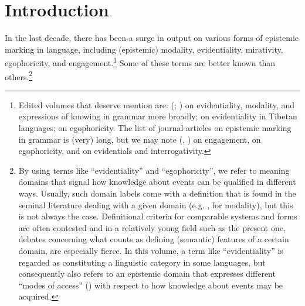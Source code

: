 \documentclass[output=paper]{langsci/langscibook}
\author{Henrik Bergqvist and Seppo Kittilä}
\begin{document}
\maketitle

\section{Introduction}\label{s:hb1}
In the last decade, there has been a surge in output on various forms of epistemic marking in language, including (epistemic) modality, evidentiality, mirativity, egophoricity, and engagement.\footnote{Edited volumes that deserve mention are: \citeauthor{AikhenvaldDixon2003} (\citeyear{AikhenvaldDixon2003}; \citeyear{AikhenvaldDixon2014}) on evidentiality, modality, and expressions of knowing in grammar more broadly; \cite{GawneHill2017} on evidentiality in Tibetan languages; \cite{SanRoqueetal2018} on egophoricity. The list of journal articles on epistemic marking in grammar is (very) long, but we may note \citeauthor{Evansetal2017a} (\citeyear{Evansetal2017a}, \citeyear{Evansetal2017b}) on engagement, \cite{BergqvistKnuchel2017} on egophoricity, and \cite{SanRoqueetal2017} on evidentials and interrogativity.}
Some of these terms are better known than others.\footnote{By using terms like “evidentiality” and “egophoricity”, we refer to meaning domains that signal how knowledge about events can be qualified in different ways. Usually, such domain labels come with a definition that is found in the seminal literature dealing with a given domain (e.g. \citealt{Palmer2001}, for modality), but this is not always the case. Definitional criteria for comparable systems and forms are often contested and in a relatively young field such as the present one, debates concerning what counts as defining (semantic) features of a certain domain, are especially fierce. In this volume, a term like “evidentiality” is regarded as constituting a linguistic category in some languages, but consequently also refers to an epistemic domain that expresses different “modes of access” (\citealt{Plungian2010}) with respect to how knowledge about events may be acquired.} 
\end{document}
